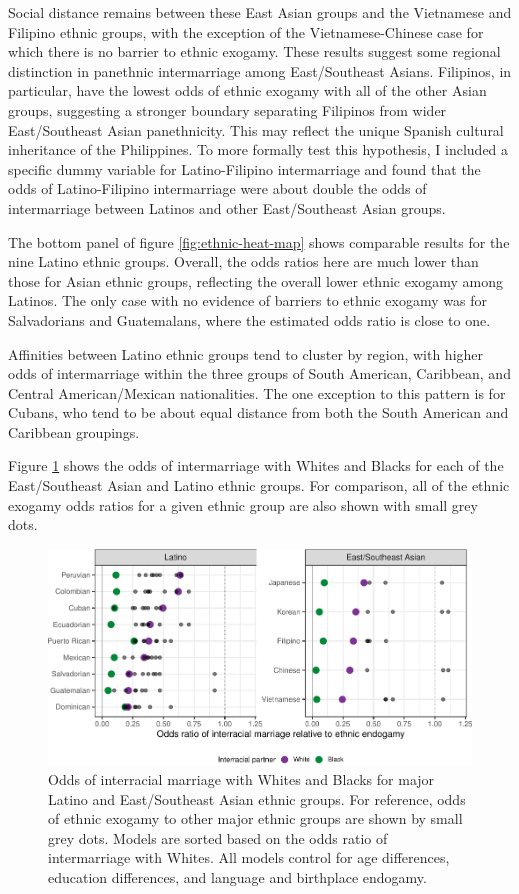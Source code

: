 \documentclass[11pt,]{article}
\begin{document}
Social distance remains between these East Asian groups and the Vietnamese and Filipino ethnic groups, with the exception of the Vietnamese-Chinese case for which there is no barrier to ethnic exogamy. These results suggest some regional distinction in panethnic intermarriage among East/Southeast Asians. Filipinos, in particular, have the lowest odds of ethnic exogamy with all of the other Asian groups, suggesting a stronger boundary separating Filipinos from wider East/Southeast Asian panethnicity. This may reflect the unique Spanish cultural inheritance of the Philippines. To more formally test this hypothesis, I included a specific dummy variable for Latino-Filipino intermarriage and found that the odds of Latino-Filipino intermarriage were about double the odds of intermarriage between Latinos and other East/Southeast Asian groups.

The bottom panel of figure \ref{fig:ethnic-heat-map} shows comparable results for the nine Latino ethnic groups. Overall, the odds ratios here are much lower than those for Asian ethnic groups, reflecting the overall lower ethnic exogamy among Latinos. The only case with no evidence of barriers to ethnic exogamy was for Salvadorians and Guatemalans, where the estimated odds ratio is close to one.

Affinities between Latino ethnic groups tend to cluster by region, with higher odds of intermarriage within the three groups of South American, Caribbean, and Central American/Mexican nationalities. The one exception to this pattern is for Cubans, who tend to be about equal distance from both the South American and Caribbean groupings.

Figure \ref{fig:racial-exogamy} shows the odds of intermarriage with Whites and Blacks for each of the East/Southeast Asian and Latino ethnic groups. For comparison, all of the ethnic exogamy odds ratios for a given ethnic group are also shown with small grey dots.

\begin{figure}
\centering
\includegraphics{main_files/figure-latex/racial-exogamy-1.pdf}
\caption{\label{fig:racial-exogamy}Odds of interracial marriage with Whites and Blacks for major Latino and East/Southeast Asian ethnic groups. For reference, odds of ethnic exogamy to other major ethnic groups are shown by small grey dots. Models are sorted based on the odds ratio of intermarriage with Whites. All models control for age differences, education differences, and language and birthplace endogamy.}
\end{figure}
\end{document}
